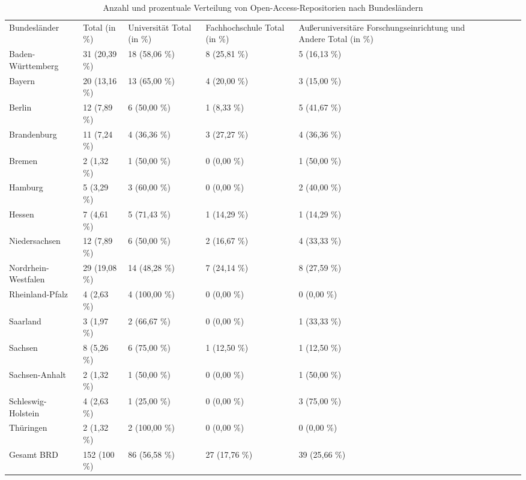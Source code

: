 \documentclass[a4paper,
fontsize=11pt,
oneside,
numbers=noperiodatend,
parskip=half-,
bibliography=totoc,
final
]{scrartcl}
\begin{document}
\begin{table}[ht!]
\small
\centering
\begin{tabular}{p{4cm}p{2.5cm}p{2.5cm}p{2.5cm}p{2.5cm} lrrrr}
  \toprule
 Bundesländer & Total (in \%)  & Universität Total (in \%)  & Fachhochschule Total (in \%)  & Außer\-univer\-sitäre Forschungs\-einrichtung und Andere Total (in \%)  \\ 
\cmidrule(r){1-1} \cmidrule(r){2-2} \cmidrule(r){3-3} \cmidrule(r){4-4} \cmidrule(r){5-5}
Baden-Württemberg & 31 (20,39 \%) & 18 (58,06 \%) & 8 (25,81 \%) & 5 (16,13 \%) \\ 
  Bayern & 20 (13,16 \%) & 13 (65,00 \%) & 4 (20,00 \%) & 3 (15,00 \%) \\ 
  Berlin & 12 (7,89 \%) & 6 (50,00 \%) & 1 (8,33 \%) & 5 (41,67 \%) \\ 
  Brandenburg & 11 (7,24 \%) & 4 (36,36 \%) & 3 (27,27 \%) & 4 (36,36 \%) \\ 
  Bremen & 2 (1,32 \%) & 1 (50,00 \%) & 0 (0,00 \%) & 1 (50,00 \%) \\ 
  Hamburg & 5 (3,29 \%) & 3 (60,00 \%) & 0 (0,00 \%) & 2 (40,00 \%) \\ 
  Hessen & 7 (4,61 \%) & 5 (71,43 \%) & 1 (14,29 \%) & 1 (14,29 \%) \\ 
  Niedersachsen & 12 (7,89 \%) & 6 (50,00 \%) & 2 (16,67 \%) & 4 (33,33 \%) \\ 
  Nordrhein-Westfalen & 29 (19,08 \%) & 14 (48,28 \%) & 7 (24,14 \%) & 8 (27,59 \%) \\ 
  Rheinland-Pfalz & 4 (2,63 \%) & 4 (100,00 \%) & 0 (0,00 \%) & 0 (0,00 \%) \\ 
  Saarland & 3 (1,97 \%) & 2 (66,67 \%) & 0 (0,00 \%) & 1 (33,33 \%) \\ 
  Sachsen & 8 (5,26 \%) & 6 (75,00 \%) & 1 (12,50 \%) & 1 (12,50 \%) \\ 
  Sachsen-Anhalt & 2 (1,32 \%) & 1 (50,00 \%) & 0 (0,00 \%) & 1 (50,00 \%) \\ 
  Schleswig-Holstein & 4 (2,63 \%) & 1 (25,00 \%) & 0 (0,00 \%) & 3 (75,00 \%) \\ 
  Thüringen & 2 (1,32 \%) & 2 (100,00 \%) & 0 (0,00 \%) & 0 (0,00 \%) \\ 
\cmidrule(r){1-1} \cmidrule(r){2-2} \cmidrule(r){3-3} \cmidrule(r){4-4} \cmidrule(r){5-5}
  Gesamt BRD & 152 (100 \%) & 86 (56,58 \%) & 27 (17,76 \%) & 39 (25,66 \%) \\
   \bottomrule
\end{tabular}
\caption{Anzahl und prozentuale Verteilung von Open-Access-Repositorien nach
Bundes\-ländern}
\end{table}
\end{document}
